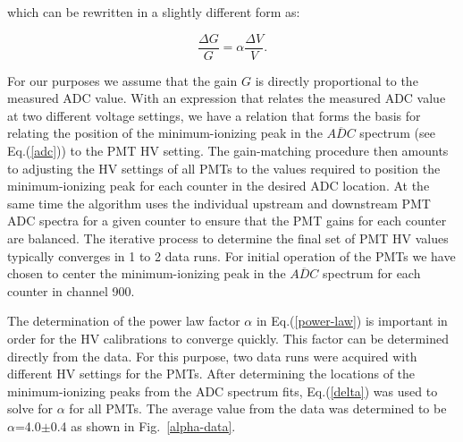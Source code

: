 \documentclass[3p,times,twocolumn]{elsarticle}
\begin{document}
\noindent
which can be rewritten in a slightly different form as:

\begin{equation}
\label{delta}
\frac{\Delta G}{G} = \alpha \frac{\Delta V}{V}.
\end{equation}

\noindent
For our purposes we assume that the gain $G$ is directly proportional to the measured ADC value. With an
expression that relates the measured ADC value at two different voltage settings, we have a relation that
forms the basis for relating the position of the minimum-ionizing peak in the $\overline{ADC}$ spectrum
(see Eq.(\ref{adc})) to the PMT HV setting. The gain-matching procedure then amounts to adjusting the HV
settings of all PMTs to the values required to position the minimum-ionizing peak for each counter in the
desired ADC location. At the same time the algorithm uses the individual upstream and downstream PMT
ADC spectra for a given counter to ensure that the PMT gains for each counter are balanced. The iterative
process to determine the final set of PMT HV values typically converges in 1 to 2 data runs. For initial
operation of the PMTs we have chosen to center the minimum-ionizing peak in the $\overline{ADC}$ spectrum
for each counter in channel 900. 

The determination of the power law factor $\alpha$ in Eq.(\ref{power-law}) is important in order for the
HV calibrations to converge quickly. This factor can be determined directly from the data. For this purpose,
two data runs were acquired with different HV settings for the PMTs. After determining the locations of
the minimum-ionizing peaks from the ADC spectrum fits, Eq.(\ref{delta}) was used to solve for $\alpha$
for all PMTs. The average value from the data was determined to be $\alpha$=4.0$\pm$0.4 as shown in
Fig.~\ref{alpha-data}.
\end{document}
